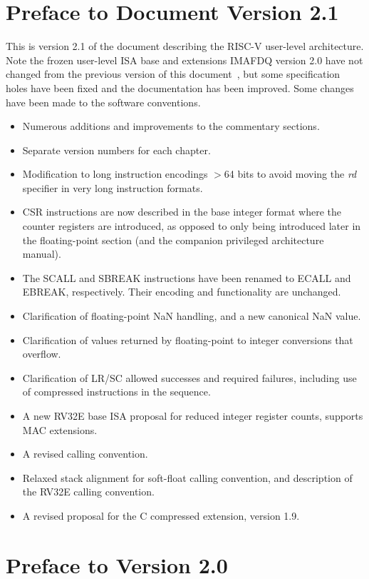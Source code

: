 \section*{Preface to Document Version 2.1}

This is version 2.1 of the document describing the RISC-V user-level
architecture.  Note the frozen user-level ISA base and extensions
IMAFDQ version 2.0 have not changed from the previous version of this
document~\cite{riscvtr2}, but some specification holes have been fixed
and the documentation has been improved.  Some changes have been made
to the software conventions.
\begin{itemize}
\parskip 0pt
\itemsep 1pt
\item Numerous additions and improvements to the commentary sections.
\item Separate version numbers for each chapter.
\item Modification to long instruction encodings $>$64 bits to avoid
  moving the {\em rd} specifier in very long instruction formats.
\item CSR instructions are now described in the base integer format
  where the counter registers are introduced, as opposed to only being
  introduced later in the floating-point section (and the companion
  privileged architecture manual).
\item The SCALL and SBREAK instructions have been renamed to ECALL and
  EBREAK, respectively.  Their encoding and functionality are unchanged.
\item Clarification of floating-point NaN handling, and a new canonical NaN
  value.
\item Clarification of values returned by floating-point to integer
  conversions that overflow.
\item Clarification of LR/SC allowed successes and required failures,
  including use of compressed instructions in the sequence.
\item A new RV32E base ISA proposal for reduced integer register
  counts, supports MAC extensions.
\item A revised calling convention.
\item Relaxed stack alignment for soft-float calling convention, and
  description of the RV32E calling convention.
\item A revised proposal for the C compressed extension, version 1.9.
\end{itemize}

\section*{Preface to Version 2.0}

